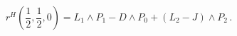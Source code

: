 \begin{equation}\label{llm22.15}
  r^H (\frac{1}{2},\frac{1}{2}, 0) = L_1 \wedge P_1 - D \wedge
  P_0 + (L_2 - J ) \wedge P_2 \, .
\end{equation}

